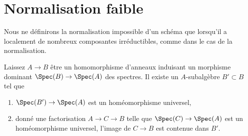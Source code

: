 \section{Normalisation faible}
\label{section-weak-normalization}

\noindent
Nous ne définirons la normalisation impossible d'un schéma que lorsqu'il a localement de nombreux composantes irréductibles, comme dans le cas de la normalisation.

\begin{lemma}

\label{lemma-relative-weak-normalization-algebra}
Laissez $A \to B$ être un homomorphisme d'anneaux induisant un morphisme dominant $\Spec(B) \to \Spec(A)$ des spectres. Il existe un $A$-subalgèbre $B' \subset B$ tel que
\begin{enumerate}
\item $\Spec(B') \to \Spec(A)$ est un homéomorphisme universel,
\item donné une factorisation $A \to C \to B$ telle que $\Spec(C) \to \Spec(A)$ est un homéomorphisme universel, l'image de $C \to B$ est contenue dans $B'$.
\end{enumerate}

\end{lemma}

